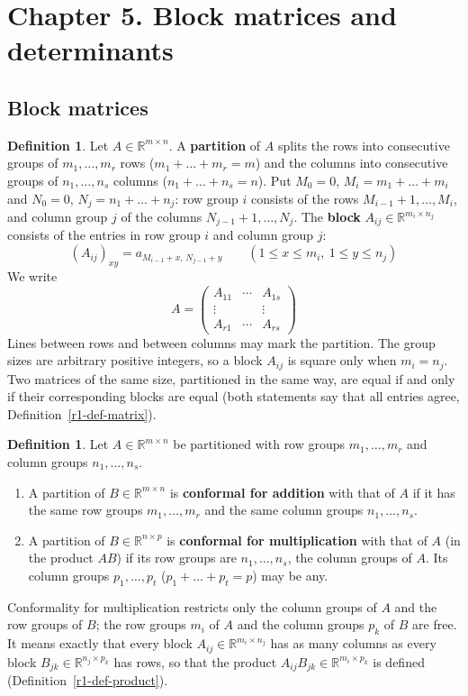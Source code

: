 \documentclass[12pt]{article}
\def\unitnumber{1}
\newcommand{\R}{\mathbb R}
\theoremstyle{definition}
\newtheorem{definition}[theorem]{Definition}
\begin{document}
\clearpage
\def\unitnumber{5}
\setcounter{theorem}{0}\setcounter{problem}{0}
\section*{Chapter 5. Block matrices and determinants}
\subsection*{Block matrices}

\begin{definition}\label{r5b-def-partition}
Let \(A\in\R^{m\times n}\). A \textbf{partition} of \(A\) splits the rows into consecutive groups
of \(m_1,\dots,m_r\) rows (\(m_1+\dots+m_r=m\)) and the columns into consecutive groups of
\(n_1,\dots,n_s\) columns (\(n_1+\dots+n_s=n\)). Put \(M_0=0\), \(M_i=m_1+\dots+m_i\) and
\(N_0=0\), \(N_j=n_1+\dots+n_j\): row group \(i\) consists of the rows \(M_{i-1}+1,\dots,M_i\),
and column group \(j\) of the columns \(N_{j-1}+1,\dots,N_j\). The \textbf{block}
\(A_{ij}\in\R^{m_i\times n_j}\) consists of the entries in row group \(i\) and column group \(j\):
\[
(A_{ij})_{xy}=a_{M_{i-1}+x,\,N_{j-1}+y}\qquad(1\leqslant x\leqslant m_i,\ 1\leqslant y\leqslant n_j)
\]
We write
\[
A=\begin{pmatrix}A_{11}&\cdots&A_{1s}\\\vdots&&\vdots\\A_{r1}&\cdots&A_{rs}\end{pmatrix}
\]
Lines between rows and between columns may mark the partition. The group sizes are arbitrary
positive integers, so a block \(A_{ij}\) is square only when \(m_i=n_j\). Two matrices of the same
size, partitioned in the same way, are equal if and only if their corresponding blocks are equal (both statements say that all entries agree,
Definition~\ref{r1-def-matrix}).
\end{definition}

\begin{definition}\label{r5b-def-conformal}
Let \(A\in\R^{m\times n}\) be partitioned with row groups \(m_1,\dots,m_r\) and column groups
\(n_1,\dots,n_s\).
\begin{enumerate}
\item A partition of \(B\in\R^{m\times n}\) is \textbf{conformal for addition} with that of \(A\)
if it has the same row groups \(m_1,\dots,m_r\) and the same column groups \(n_1,\dots,n_s\).
\item A partition of \(B\in\R^{n\times p}\) is \textbf{conformal for multiplication} with that
of \(A\) (in the product \(AB\)) if its row groups are \(n_1,\dots,n_s\), the column groups of
\(A\). Its column groups \(p_1,\dots,p_t\) (\(p_1+\dots+p_t=p\)) may be any.
\end{enumerate}
\end{definition}
Conformality for multiplication restricts only the column groups of \(A\) and the row groups of
\(B\); the row groups \(m_i\) of \(A\) and the column groups \(p_k\) of \(B\) are free. It means
exactly that every block \(A_{ij}\in\R^{m_i\times n_j}\) has as many columns as every block
\(B_{jk}\in\R^{n_j\times p_k}\) has rows, so that the product \(A_{ij}B_{jk}\in\R^{m_i\times p_k}\)
is defined (Definition~\ref{r1-def-product}).
\end{document}
